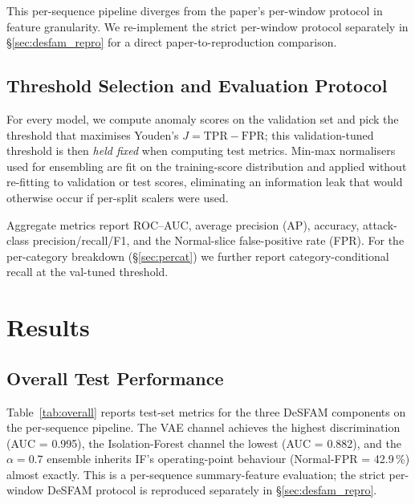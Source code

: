 \documentclass[conference,10pt]{IEEEtran}
\begin{document}
This per-sequence pipeline diverges from the paper's per-window protocol
in feature granularity. We re-implement the strict per-window protocol
separately in \S\ref{sec:desfam_repro} for a direct paper-to-reproduction
comparison.

\subsection{Threshold Selection and Evaluation Protocol}
\label{sec:eval}

For every model, we compute anomaly scores on the validation set and pick
the threshold that maximises Youden's $J = \text{TPR} - \text{FPR}$;
this validation-tuned threshold is then \emph{held fixed} when computing
test metrics. Min-max normalisers used for ensembling are fit on the
training-score distribution and applied without re-fitting to validation
or test scores, eliminating an information leak that would otherwise occur
if per-split scalers were used.

Aggregate metrics report ROC--AUC, average precision (AP), accuracy,
attack-class precision/recall/F1, and the Normal-slice false-positive
rate (FPR). For the per-category breakdown (\S\ref{sec:percat}) we further
report category-conditional recall at the val-tuned threshold.

\section{Results}
\label{sec:results}

\subsection{Overall Test Performance}

Table~\ref{tab:overall} reports test-set metrics for the three DeSFAM
components on the per-sequence pipeline. The VAE channel achieves the
highest discrimination (AUC = 0.995), the Isolation-Forest channel the
lowest (AUC = 0.882), and the $\alpha = 0.7$ ensemble inherits IF's
operating-point behaviour (Normal-FPR = 42.9\,\%) almost exactly. This
is a per-sequence summary-feature evaluation; the strict per-window
DeSFAM protocol is reproduced separately in \S\ref{sec:desfam_repro}.
\end{document}
